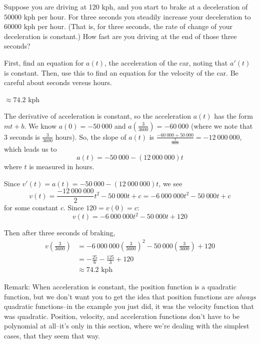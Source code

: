\begin{question}
Suppose you are driving at 120 kph, and you start to brake at a deceleration of $50 000$ kph per hour. For three seconds you steadily increase your deceleration to $60 000$ kph per hour. (That is, for three seconds, the rate of change of your deceleration is constant.) How fast are you driving at the end of those three seconds?
\end{question}
\begin{hint}
First, find an equation for $a(t)$, the acceleration of the car, noting that $a'(t)$ is constant. Then, use this to find an equation for the velocity of the car. Be careful about seconds versus hours.
\end{hint}
\begin{answer}
$\approx 74.2$ kph
\end{answer}
\begin{solution}
The derivative of acceleration is constant, so the acceleration $a(t)$ has the form $mt+b$. We know $a(0)=-50~000$ and $a\left(\frac{3}{3600}\right)=-60~000$ (where we note that $3$ seconds is $\frac{3}{3600}$ hours). So, the slope of $a(t)$ is
$\frac{-60~000+50~000}{\frac{3}{3600}}=-12~000~000$, which leads us to
\[a(t)=-50~000-(12~000~000)t\]
where $t$ is measured in hours.

Since $v'(t)=a(t)=-50~000-(12~000~000)t$, we see
\[v(t)=\frac{-12~
000~000}{2}t^2-50~000t+c=-6~000~000t^2-50~000t+c\]
for some constant $c$. Since $120=v(0)=c$:
\[v(t)=-6~000~000t^2-50~000t+120\]

Then after three seconds of braking,
\begin{align*}v\left(\frac{3}{3600}\right)
&=-6~000~000\left(\frac{3}{3600}\right)^2-50~000\left(\frac{3}{3600}\right)+120\\
&=-\frac{25}{6}-\frac{125}{3}+120\\
&\approx 74.2 \mbox{ kph}
\end{align*}

Remark: When acceleration is constant, the position function is a quadratic function, but we don't want you to get the idea that position functions are \emph{always} quadratic functions--in the example you just did, it was the velocity function that was quadratic. Position, velocity, and acceleration functions don't have to be polynomial at all--it's only in this section, where we're dealing with the simplest cases, that they seem that way.
\end{solution}

\subsection*{\Application}

